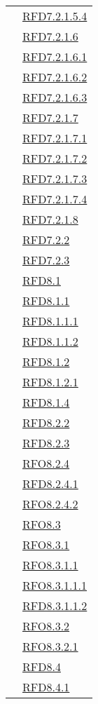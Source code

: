 \begin{longtable}{|>{\centering}m{5cm}|m{5cm}<{\centering}|}
& \hyperlink{RFD7.2.1.5.4}{RFD7.2.1.5.4}\\
& \hyperlink{RFD7.2.1.6}{RFD7.2.1.6}\\
& \hyperlink{RFD7.2.1.6.1}{RFD7.2.1.6.1}\\
& \hyperlink{RFD7.2.1.6.2}{RFD7.2.1.6.2}\\
& \hyperlink{RFD7.2.1.6.3}{RFD7.2.1.6.3}\\
& \hyperlink{RFD7.2.1.7}{RFD7.2.1.7}\\
& \hyperlink{RFD7.2.1.7.1}{RFD7.2.1.7.1}\\
& \hyperlink{RFD7.2.1.7.2}{RFD7.2.1.7.2}\\
& \hyperlink{RFD7.2.1.7.3}{RFD7.2.1.7.3}\\
& \hyperlink{RFD7.2.1.7.4}{RFD7.2.1.7.4}\\
& \hyperlink{RFD7.2.1.8}{RFD7.2.1.8}\\
& \hyperlink{RFD7.2.2}{RFD7.2.2}\\
& \hyperlink{RFD7.2.3}{RFD7.2.3}\\
& \hyperlink{RFD8.1}{RFD8.1}\\
& \hyperlink{RFD8.1.1}{RFD8.1.1}\\
& \hyperlink{RFD8.1.1.1}{RFD8.1.1.1}\\
& \hyperlink{RFD8.1.1.2}{RFD8.1.1.2}\\
& \hyperlink{RFD8.1.2}{RFD8.1.2}\\
& \hyperlink{RFD8.1.2.1}{RFD8.1.2.1}\\
& \hyperlink{RFD8.1.4}{RFD8.1.4}\\
& \hyperlink{RFD8.2.2}{RFD8.2.2}\\
& \hyperlink{RFD8.2.3}{RFD8.2.3}\\
& \hyperlink{RFO8.2.4}{RFO8.2.4}\\
& \hyperlink{RFD8.2.4.1}{RFD8.2.4.1}\\
& \hyperlink{RFO8.2.4.2}{RFO8.2.4.2}\\
& \hyperlink{RFO8.3}{RFO8.3}\\
& \hyperlink{RFO8.3.1}{RFO8.3.1}\\
& \hyperlink{RFO8.3.1.1}{RFO8.3.1.1}\\
& \hyperlink{RFO8.3.1.1.1}{RFO8.3.1.1.1}\\
& \hyperlink{RFD8.3.1.1.2}{RFD8.3.1.1.2}\\
& \hyperlink{RFO8.3.2}{RFO8.3.2}\\
& \hyperlink{RFO8.3.2.1}{RFO8.3.2.1}\\
& \hyperlink{RFD8.4}{RFD8.4}\\
& \hyperlink{RFD8.4.1}{RFD8.4.1}\\

\end{longtable}
